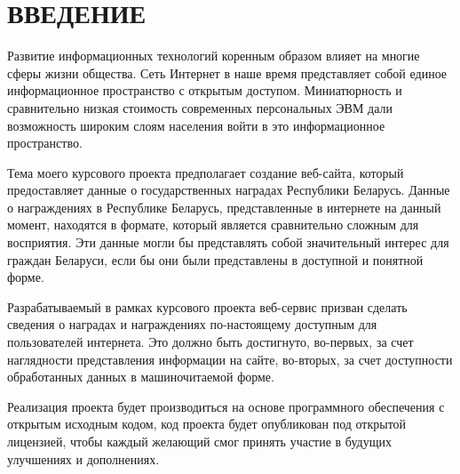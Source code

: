\section*{ВВЕДЕНИЕ}

Развитие информационных технологий коренным образом влияет 
на многие сферы жизни общества.
Сеть Интернет в наше время представляет собой единое
информационное пространство с открытым доступом.
Миниатюрность и сравнительно низкая стоимость современных
персональных ЭВМ дали возможность широким слоям населения
войти в это информационное пространство.

Тема моего курсового проекта предполагает создание веб-сайта,
который предоставляет данные о государственных наградах 
Республики Беларусь.
Данные о награждениях в Республике Беларусь, 
представленные в интернете на данный момент, находятся в формате, 
который является сравнительно сложным для восприятия.
Эти данные могли бы представлять собой значительный интерес для
граждан Беларуси, если бы они были представлены в доступной и понятной форме.

Разрабатываемый в рамках курсового проекта веб-сервис призван
сделать сведения о наградах и награждениях
по-настоящему доступным для пользователей интернета.
Это должно быть достигнуто, во-первых, за счет наглядности представления 
информации на сайте, во-вторых, за счет доступности
обработанных данных в машиночитаемой форме. 

Реализация проекта будет производиться 
на основе программного обеспечения с открытым исходным кодом,
код проекта будет опубликован под открытой лицензией, чтобы каждый желающий
смог принять участие в будущих улучшениях и дополнениях.
